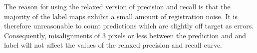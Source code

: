 The reason for using the relaxed version of precision and recall is that the majority of the label maps exhibit a small amount of registration noise. It is therefore unreasonable to count predictions which are slightly off target as errors. Consequently, misalignments of 3 pixels or less between the prediction and and label will not affect the values of the relaxed precision and recall curve.\\




